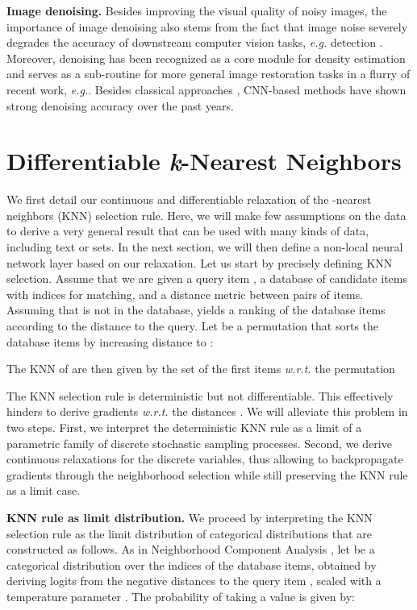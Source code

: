 \documentclass{article}
\makeatletter
\newcommand{\eg}{\emph{e.\thinspace{}g.}\@\xspace}
\newcommand{\wrt}{\emph{w.\thinspace{}r.\thinspace{}t.}\@\xspace}
\newcommand{\myparagraph}[1]{\smallskip\noindent\textbf{#1}}
\makeatother
\begin{document}
\myparagraph{Image denoising.}
Besides improving the visual quality of noisy images, the importance of image denoising also stems from the fact that image noise severely degrades the accuracy of downstream computer vision tasks, \eg detection \cite{Diamond:2017:DPO}. 
Moreover, denoising has been recognized as a core module for density estimation \cite{Alain:2014:WRA} and serves as a sub-routine for more general image restoration tasks in a flurry of recent work, \eg \cite{Bigdeli:2017:DMS,Romano:2017:TLE,Zhang:2017:LDC}. 
Besides classical approaches \cite{Donoho:1995:DST,Roth:2009:FEF}, CNN-based methods \cite{Jain:2009:NID,Mao:2016:IRU,Zhang:2017:BGD} have shown strong denoising accuracy over the past years.
 

\section{Differentiable \emph{k}-Nearest Neighbors}
\label{sec:matching}
We first detail our continuous and differentiable relaxation of the
-nearest neighbors (KNN) selection rule.
Here, we will make few assumptions on the data to derive a very general result that can be used with many kinds of data, including text or sets.
In the next section, we will then define a non-local neural network layer based on our relaxation.
Let us start by precisely defining KNN selection. 
Assume that we are given a query item , a database of candidate
items  with indices  for matching, and a distance metric  between pairs of items. 
Assuming that  is not in the database,  yields a ranking of the database items
according to the distance to the query. 
Let  be a permutation 
that sorts the database items by
increasing distance to :

The KNN of  are then given by the set of the first  items \wrt the permutation 

The KNN selection rule is deterministic but not differentiable. 
This effectively hinders to derive gradients \wrt the distances . 
We will alleviate this problem in two steps. 
First, we interpret the deterministic KNN rule as a limit of a parametric family of discrete stochastic sampling
processes. 
Second, we derive continuous relaxations for the discrete variables, 
thus allowing to
backpropagate gradients through the neighborhood selection while still preserving
the KNN rule as a limit case.

\myparagraph{KNN rule as limit distribution.}
We proceed by interpreting the KNN selection rule as the limit distribution of  categorical distributions that are constructed as follows. 
As in Neighborhood Component Analysis \cite{Goldberger:2005:NCA},
let 
be a categorical distribution over the indices  of the database items, obtained by deriving logits  from the negative distances to the query item , scaled with a temperature parameter . 
The probability of  taking a value  is given by:
\end{document}
